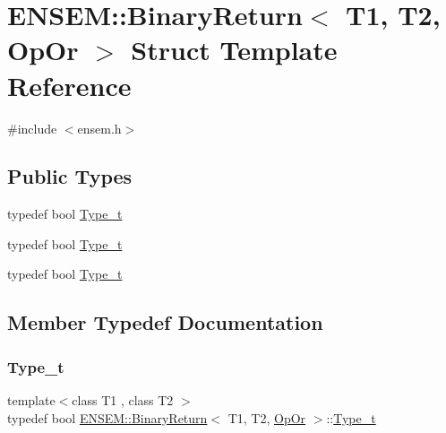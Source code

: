 \hypertarget{structENSEM_1_1BinaryReturn_3_01T1_00_01T2_00_01OpOr_01_4}{}\section{E\+N\+S\+EM\+:\+:Binary\+Return$<$ T1, T2, Op\+Or $>$ Struct Template Reference}
\label{structENSEM_1_1BinaryReturn_3_01T1_00_01T2_00_01OpOr_01_4}


{\ttfamily \#include $<$ensem.\+h$>$}

\subsection*{Public Types}
\begin{DoxyCompactItemize}
\item 
typedef bool \mbox{\hyperlink{structENSEM_1_1BinaryReturn_3_01T1_00_01T2_00_01OpOr_01_4_acabcdd16b12fa1840e7408d6b811491e}{Type\+\_\+t}}
\item 
typedef bool \mbox{\hyperlink{structENSEM_1_1BinaryReturn_3_01T1_00_01T2_00_01OpOr_01_4_acabcdd16b12fa1840e7408d6b811491e}{Type\+\_\+t}}
\item 
typedef bool \mbox{\hyperlink{structENSEM_1_1BinaryReturn_3_01T1_00_01T2_00_01OpOr_01_4_acabcdd16b12fa1840e7408d6b811491e}{Type\+\_\+t}}
\end{DoxyCompactItemize}


\subsection{Member Typedef Documentation}
\mbox{\label{structENSEM_1_1BinaryReturn_3_01T1_00_01T2_00_01OpOr_01_4_acabcdd16b12fa1840e7408d6b811491e}} 
\subsubsection{\texorpdfstring{Type\_t}{Type\_t}\hspace{0.1cm}{\footnotesize\ttfamily [1/3]}}
{\footnotesize\ttfamily template$<$class T1 , class T2 $>$ \\
typedef bool \mbox{\hyperlink{structENSEM_1_1BinaryReturn}{E\+N\+S\+E\+M\+::\+Binary\+Return}}$<$ T1, T2, \mbox{\hyperlink{structENSEM_1_1OpOr}{Op\+Or}} $>$\+::\mbox{\hyperlink{structENSEM_1_1BinaryReturn_3_01T1_00_01T2_00_01OpOr_01_4_acabcdd16b12fa1840e7408d6b811491e}{Type\+\_\+t}}}

